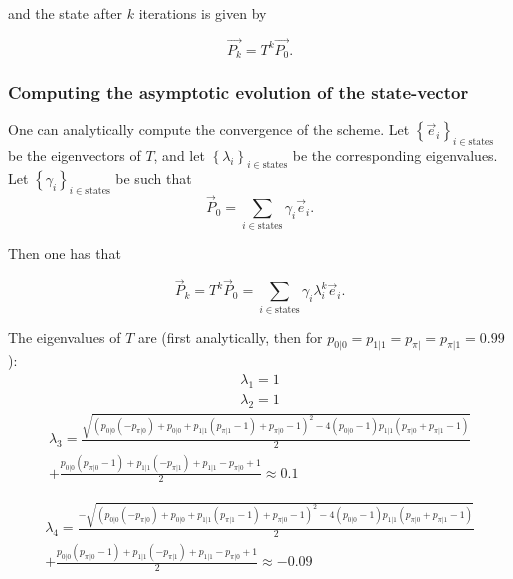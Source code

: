 and the state after $k$ iterations is given by

\begin{equation}
   \Vec{P_k} = T^k \Vec{P_0}.
\end{equation}

\subsubsection{Computing the asymptotic evolution of the state-vector}

One can analytically compute the convergence of the scheme. Let $\left\{\vec e_i\right\}_{i\in \mathrm{states}}$ be the eigenvectors of $T$, and let $\left\{\lambda_i\right\}_{i\in \mathrm{states}}$ be the corresponding eigenvalues. Let $\left\{\gamma_i\right\}_{i\in \mathrm{states}}$ be such that 
\begin{equation}
    \vec P_0 = \sum_{i\in \mathrm{states}} \gamma_i \vec e_i.
\end{equation}

Then one has that 

\begin{equation}
    \vec P_k = T^k \vec P_0 =  \sum_{i\in \mathrm{states}} \gamma_i \lambda_i^k  \vec e_i.
\end{equation}

The eigenvalues of $T$ are (first analytically, then for $p_{0|0} = p_{1|1} = p_{\pi|} = p_{\pi|1} = 0.99$): 
\begin{eqnarray}
\lambda_1 = 1 \\
\lambda_2 = 1
\end{eqnarray}
\begin{equation}
\begin{split}
\lambda_3 = \frac{\sqrt{(p_{0|0} (-p_{\pi|0})+p_{0|0}+p_{1|1} (p_{\pi|1}-1)+p_{\pi|0}-1)^2-4 (p_{0|0}-1) p_{1|1} (p_{\pi|0}+p_{\pi|1}-1)}}{2} \\
+\frac{p_{0|0} (p_{\pi|0}-1)+p_{1|1} (-p_{\pi|1})+p_{1|1}-p_{\pi|0}+1}{2} \approx 0.1
\end{split}
\end{equation}

\begin{equation}
\begin{split}
\lambda_4 = \frac{-\sqrt{(p_{0|0} (-p_{\pi|0})+p_{0|0}+p_{1|1} (p_{\pi|1}-1)+p_{\pi|0}-1)^2-4 (p_{0|0}-1) p_{1|1} (p_{\pi|0}+p_{\pi|1}-1)}}{2} \\
+\frac{p_{0|0} (p_{\pi|0}-1)+p_{1|1} (-p_{\pi|1})+p_{1|1}-p_{\pi|0}+1}{2} \approx -0.09
\end{split}
\end{equation}

